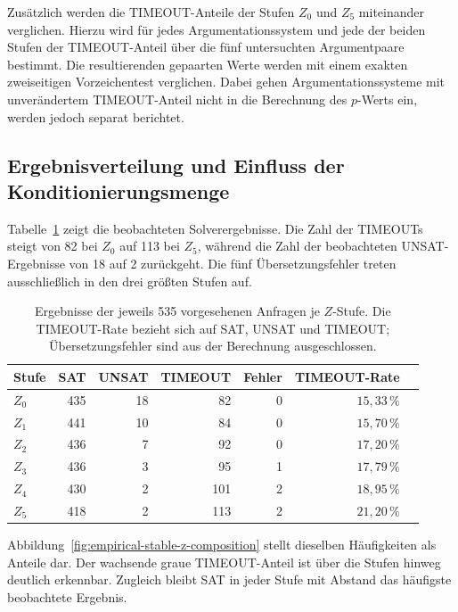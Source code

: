 Zusätzlich werden die TIMEOUT-Anteile der Stufen \(Z_0\) und \(Z_5\)
miteinander verglichen. Hierzu wird für jedes Argumentationssystem und
jede der beiden Stufen der TIMEOUT-Anteil über die fünf untersuchten
Argumentpaare bestimmt. Die resultierenden gepaarten Werte werden mit
einem exakten zweiseitigen Vorzeichentest verglichen. Dabei gehen
Argumentationssysteme mit unverändertem TIMEOUT-Anteil nicht in die
Berechnung des \(p\)-Werts ein, werden jedoch separat berichtet.
\fi

\iffalse
\subsection{Ergebnisverteilung und Einfluss der Konditionierungsmenge}
\label{subsec:empirical-stable-z-status}

Tabelle~\ref{tab:empirical-stable-z-status} zeigt die beobachteten
Solverergebnisse. Die Zahl der TIMEOUTs steigt von 82 bei \(Z_0\) auf 113
bei \(Z_5\), während die Zahl der beobachteten UNSAT-Ergebnisse von 18 auf
2 zurückgeht. Die fünf Übersetzungsfehler treten ausschließlich in den drei
größten Stufen auf.

\begin{table}[tb]
    \centering
    \caption[Ergebnisse nach Größe der Konditionierungsmenge]{Ergebnisse der jeweils 535
    vorgesehenen Anfragen je \(Z\)-Stufe. Die TIMEOUT-Rate bezieht sich auf
    SAT, UNSAT und TIMEOUT; Übersetzungsfehler sind aus der Berechnung
    ausgeschlossen.}
    \label{tab:empirical-stable-z-status}
    \small
    \begin{tabular}{lrrrrrr}
        \toprule
        Stufe & SAT & UNSAT & TIMEOUT & Fehler
        & TIMEOUT-Rate \\
        \midrule
        \(Z_0\) & 435 & 18 & 82  & 0 & \(15{,}33\,\%\) \\
        \(Z_1\) & 441 & 10 & 84  & 0 & \(15{,}70\,\%\) \\
        \(Z_2\) & 436 & 7  & 92  & 0 & \(17{,}20\,\%\) \\
        \(Z_3\) & 436 & 3  & 95  & 1 & \(17{,}79\,\%\) \\
        \(Z_4\) & 430 & 2  & 101 & 2 & \(18{,}95\,\%\) \\
        \(Z_5\) & 418 & 2  & 113 & 2 & \(21{,}20\,\%\) \\
        \bottomrule
    \end{tabular}
\end{table}

\iffalse
Abbildung~\ref{fig:empirical-stable-z-composition} stellt dieselben
Häufigkeiten als Anteile dar. Der wachsende graue TIMEOUT-Anteil ist über
die Stufen hinweg deutlich erkennbar. Zugleich bleibt SAT in jeder Stufe
mit Abstand das häufigste beobachtete Ergebnis.


